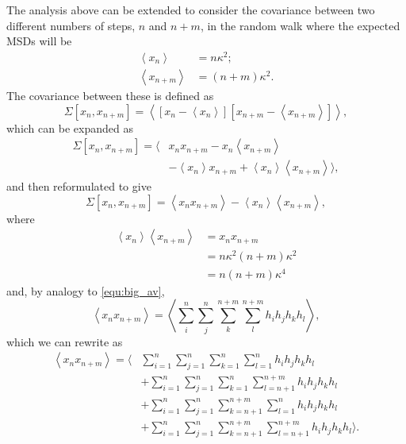 \documentclass[reprint,superscriptaddress,nobibnotes,amsmath,amssymb,aps,prx,hidelinks]{revtex4-2}
\newcommand{\oMSDn}{\ensuremath{x_n}}
\newcommand{\oMSDm}{\ensuremath{x_{n + m}}}
\newcommand{\moMSDn}{\ensuremath{\left<\oMSDn\right>}}
\newcommand{\moMSDm}{\ensuremath{\left<\oMSDm\right>}}
\begin{document}
The analysis above can be extended to consider the covariance between two different numbers of steps, $n$ and $n+m$, in the random walk where the expected MSDs will be
\begin{equation}
    \begin{aligned}
        \moMSDn &= n\kappa^2; \\
        \moMSDm &= (n+m)\kappa^2.
    \end{aligned}
\end{equation}
The covariance between these is defined as
\begin{equation}
    \Sigma \left[\oMSDn, \oMSDm \right] = \left<{\left[{\oMSDn - \moMSDn}\right] \left[{\oMSDm - \moMSDm}\right]}\right>, 
\end{equation}
which can be expanded as
\begin{equation}
    \begin{aligned}
        \Sigma \left[\oMSDn, \oMSDm \right] = \big\langle & \oMSDn\oMSDm - \oMSDn\moMSDm \\
        & - \moMSDn\oMSDm + \moMSDn\moMSDm\big\rangle,
    \end{aligned}
\end{equation}
and then reformulated to give
\begin{equation}
    \Sigma \left[\oMSDn, \oMSDm \right] = \left<\oMSDn\oMSDm\right> - \moMSDn\moMSDm,
    \label{equ:pair}
\end{equation}
where 
\begin{equation}
    \begin{aligned}
        \moMSDn\moMSDm &= \oMSDn\oMSDm \\
                       &= n\kappa^2(n+m)\kappa^2 \\
                       &= n(n+m)\kappa^4
    \end{aligned}
\end{equation}
and, by analogy to \cref{equ:big_av},
\begin{equation}
    \left<\oMSDn\oMSDm\right> = \left<\sum_i^n\sum_j^n\sum_k^{n+m}\sum_l^{n+m} h_i h_j h_k h_l\right>,
\end{equation}
which we can rewrite as
\begin{equation}
    \begin{aligned}
        \left<\oMSDn\oMSDm\right> = \Bigg\langle & \sum_{i=1}^n\sum_{j=1}^n\sum_{k=1}^{n}\sum_{l=1}^{n} h_i h_j h_k h_l \\
        & + \sum_{i=1}^n\sum_{j=1}^n\sum_{k=1}^{n}\sum_{l=n+1}^{n+m} h_i h_j h_k h_l \\
        & + \sum_{i=1}^n\sum_{j=1}^n\sum_{k=n+1}^{n+m}\sum_{l=1}^{n} h_i h_j h_k h_l \\
        & + \sum_{i=1}^n\sum_{j=1}^n\sum_{k=n+1}^{n+m}\sum_{l=n+1}^{n+m} h_i h_j h_k h_l \Bigg\rangle.
    \end{aligned}
    \label{equ:vbig}
\end{equation}
\end{document}
